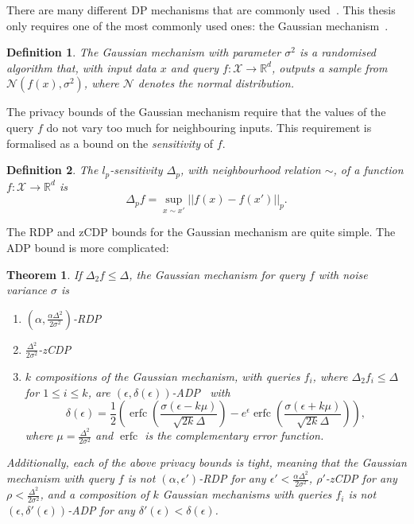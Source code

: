 \documentclass[english,twoside,openright]{HYgraduMLDS}
\newtheorem{theorem}{Theorem}
\newtheorem{definition}{Definition}
\newcommand{\R}{\mathbb{R}}
\newcommand{\calx}{{\mathcal{X}}}
\newcommand{\caln}{{\mathcal{N}}}
\DeclareMathOperator{\erfc}{erfc}
\begin{document}
There are many different DP mechanisms that are commonly used~\cite{DwR14}.
This thesis only requires one of the most commonly 
used ones: the Gaussian mechanism~\cite{DKM06}.
\begin{definition}
  The Gaussian mechanism with parameter \(\sigma^2\) is a randomised algorithm that,
  with input data \(x\) and query \(f\colon \calx\to \R^{d}\), outputs a sample from
  \(\caln(f(x), \sigma^2)\), where \(\caln\) denotes the normal distribution.
\end{definition}

The privacy bounds of the Gaussian mechanism require that the values of the
query \(f\) do not vary too much for neighbouring inputs. This requirement
is formalised as a bound on the \emph{sensitivity} of \(f\).
\begin{definition}
    The \(l_p\)-sensitivity \(\Delta_p\), with neighbourhood relation \(\sim\),
    of a function \(f\colon \calx \to \R^d\)
    is
    \[
        \Delta_p f = \sup_{x\sim x'}||f(x) - f(x')||_p.
    \]
\end{definition}

The RDP and zCDP bounds for the Gaussian 
mechanism are quite simple. The ADP bound is more complicated:

\begin{theorem}\label{gauss-DP-bounds}
  If \(\Delta_{2}f \leq \Delta\), the Gaussian mechanism for query \(f\) with
  noise variance \(\sigma\) is
    \begin{enumerate}
        \item 
            \((\alpha, \frac{\alpha \Delta^2}{2\sigma^2})\)-RDP~\cite{Mironov17}
        \item 
            \(\frac{\Delta^2}{2\sigma^2}\)-zCDP~\cite{BuS16}
        \item 
            \(k\) compositions of the Gaussian mechanism, with
            queries \(f_{i}\), where \(\Delta_{2}f_{i}\leq \Delta\) for
            \(1\leq i \leq k\), are
            \((\epsilon, \delta(\epsilon))\)-ADP~\cite{Sommer2019} with 
            \[
                \delta(\epsilon) 
                = \frac{1}{2}\left(
                    \erfc\left(\frac{\sigma(\epsilon - k\mu)}{\sqrt{2k}\Delta}\right)
                    - e^\epsilon \erfc\left(\frac{\sigma(\epsilon + k\mu)}{\sqrt{2k}\Delta}\right)
                \right),
            \]
            where \(\mu = \frac{\Delta^2}{2\sigma^2}\) and \(\erfc\) is 
            the complementary error function.
    \end{enumerate}
    Additionally, each of the above privacy bounds is tight, meaning that
    the Gaussian mechanism with query \(f\) is not \((\alpha, \epsilon')\)-RDP
    for any \(\epsilon' < \frac{\alpha\Delta^{2}}{2\sigma^{2}}\), \(\rho'\)-zCDP
    for any \(\rho < \frac{\Delta^{2}}{2\sigma^{2}}\), and a composition
    of \(k\) Gaussian mechanisms with queries \(f_{i}\) is not
    \((\epsilon, \delta'(\epsilon))\)-ADP for any
    \(\delta'(\epsilon) < \delta(\epsilon)\).
\end{theorem}
\end{document}
